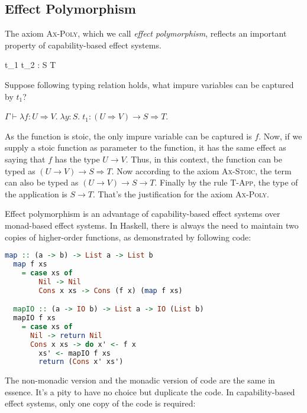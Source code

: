 \subsection{Effect Polymorphism}

\label{sec:effect-polymorphism}

The axiom \textsc{Ax-Poly}, which we call \emph{effect polymorphism},
reflects an important property of capability-based effect
systems.

 { \Gamma \vdash t_1 \;
  t_2 : S \to T }


Suppose following typing relation holds, what impure
variables can be captured by $t_1$?

\begin{center}
  $\Gamma \vdash \lambda f:U \Rightarrow V. \; \lambda y:S. \; t_1 : (U
  \Rightarrow V) \to S \Rightarrow T$.
\end{center}

As the function is stoic, the only impure variable can be captured is
$f$. Now, if we supply a stoic function as parameter to the function,
it has the same effect as saying that $f$ has the type $U \to V$.
Thus, in this context, the function can be typed as
$(U \to V) \to S \Rightarrow T$.  Now according to the axiom
\textsc{Ax-Stoic}, the term can also be typed as
$(U \to V) \to S \to T$. Finally by the rule \textsc{T-App}, the type
of the application is $S \to T$. That's the justification for the
axiom \textsc{Ax-Poly}.

Effect polymorphism is an advantage of capability-based effect systems
over monad-based effect systems. In Haskell, there is always the need
to maintain two copies of higher-order functions, as demonstrated by
following code:

\begin{lstlisting}[language=Haskell]
  map :: (a -> b) -> List a -> List b
  map f xs
    = case xs of
        Nil -> Nil
        Cons x xs -> Cons (f x) (map f xs)

  mapIO :: (a -> IO b) -> List a -> IO (List b)
  mapIO f xs
    = case xs of
      Nil -> return Nil
      Cons x xs -> do x' <- f x
        xs' <- mapIO f xs
        return (Cons x' xs')
\end{lstlisting}

The non-monadic version and the monadic version of code are the same
in essence. It's a pity to have no choice but duplicate the code. In
capability-based effect systems, only one copy of the code is
required:

